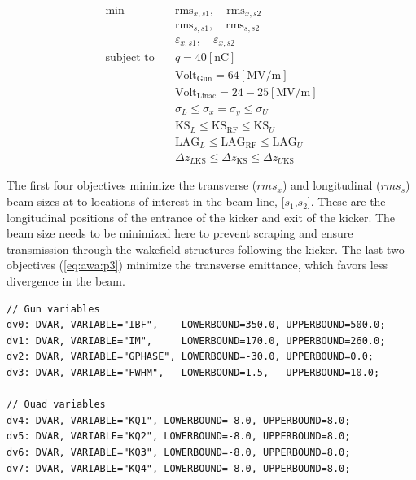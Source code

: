 \begin{align}
\text{min}  \quad & \text{rms}_{x, s1}, \quad \text{rms}_{x, s2} \label{eq:awa:p1}\\
& \text{rms}_{s, s1}, \quad \text{rms}_{s, s2} \label{eq:awa:p2}\\
& \varepsilon_{x,s1}, \quad \varepsilon_{x,s2} \label{eq:awa:p3} \\
\text{subject to} \quad & q = 40 \left[\text{nC}\right] \label{eq:awa:firstconstr}\\
\quad & \text{Volt}_{\text{Gun}} = 64\left[\text{MV/m}\right] \label{eq:awa:lastconstr}\\
\quad & \text{Volt}_{\text{Linac}} = 24-25\left[\text{MV/m}\right] \\
\quad & \sigma_{L} \leq \sigma_x = \sigma_y \leq \sigma_{U} \label{eq:awa:firstdvar}\\
\quad & \text{KS}_{L} \leq \text{KS}_{\text{RF}} \leq \text{KS}_{U} \label{eq:awa:seconddvar}\\
\quad & \text{LAG}_{L} \leq \text{LAG}_{\text{RF}} \leq \text{LAG}_{U} \\
\quad & \Delta z_{L\text{KS}} \leq \Delta z_{\text{KS}} \leq \Delta z_{U\text{KS}} \label{eq:awa:lastdvar}
\end{align}

The first four objectives minimize the transverse ($rms_x$) and longitudinal ($rms_s$) 
beam sizes at to locations of interest in the beam line, [$s_1$,$s_2$]. 
These are the longitudinal positions of 
the entrance of the kicker and exit of the kicker. The beam size needs to be minimized
here to prevent scraping and ensure transmission through the wakefield structures 
following the kicker. The last two objectives (\ref{eq:awa:p3}) minimize the 
transverse emittance, which favors less divergence in the beam.


\vspace{0.2cm}
{\footnotesize \begin{verbatim}
// Gun variables
dv0: DVAR, VARIABLE="IBF",    LOWERBOUND=350.0, UPPERBOUND=500.0;
dv1: DVAR, VARIABLE="IM",     LOWERBOUND=170.0, UPPERBOUND=260.0;
dv2: DVAR, VARIABLE="GPHASE", LOWERBOUND=-30.0, UPPERBOUND=0.0;
dv3: DVAR, VARIABLE="FWHM",   LOWERBOUND=1.5,   UPPERBOUND=10.0;

// Quad variables
dv4: DVAR, VARIABLE="KQ1", LOWERBOUND=-8.0, UPPERBOUND=8.0;
dv5: DVAR, VARIABLE="KQ2", LOWERBOUND=-8.0, UPPERBOUND=8.0;
dv6: DVAR, VARIABLE="KQ3", LOWERBOUND=-8.0, UPPERBOUND=8.0;
dv7: DVAR, VARIABLE="KQ4", LOWERBOUND=-8.0, UPPERBOUND=8.0;

	\end{verbatim}}
\vspace{0.2cm}
 
